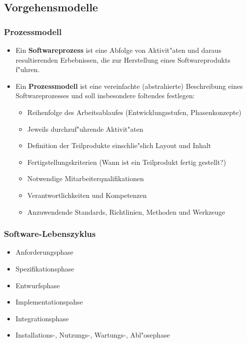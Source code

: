 \subsection{Vorgehensmodelle}

\subsubsection{Prozessmodell}

\begin{itemize}
\item Ein \textbf{Softwareprozess} ist eine Abfolge von Aktivit"aten und daraus resultierenden Erbebnissen, die zur Herstellung eines Softwareprodukts f"uhren.
\item Ein \textbf{Prozessmodell} ist eine vereinfachte (abstrahierte) Beschreibung eines Softwareprozesses und soll insbesondere foltendes festlegen:
    \begin{itemize}
    \item Reihenfolge des Arbeitsablaufes (Entwicklungsstufen, Phasenkonzepte)
    \item Jeweils durchzuf"uhrende Aktivit"aten
    \item Definition der Teilprodukte einschlie"slich Layout und Inhalt
    \item Fertigstellungskriterien (Wann ist ein Teilprodukt fertig gestellt?)
    \item Notwendige Mitarbeiterqualifikationen
    \item Verantwortlichkeiten und Kompetenzen
    \item Anzuwendende Standards, Richtlinien, Methoden und Werkzeuge
    \end{itemize}
\end{itemize}


\subsubsection{Software-Lebenszyklus}

\begin{itemize}
    \item Anforderungsphase
    \item Spezifikationsphase
    \item Entwurfsphase
    \item Implementationspahse
    \item Integrationsphase
    \item Installations-, Nutzungs-, Wartungs-, Abl"osephase
\end{itemize}

